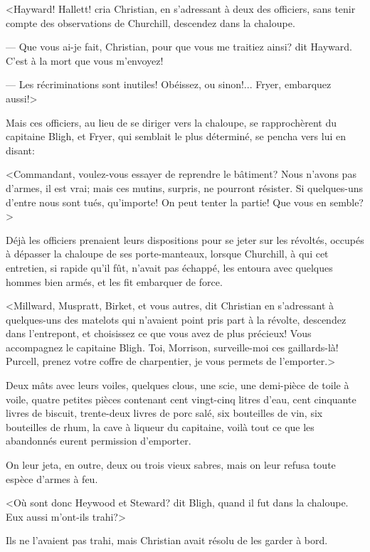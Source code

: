 <Hayward! Hallett! cria Christian, en s'adressant \`a deux
des officiers, sans tenir compte des observations de Churchill,
descendez dans la chaloupe.

--- Que vous ai-je fait, Christian, pour que vous me traitiez
ainsi? dit Hayward. C'est \`a la mort que vous m'envoyez!

--- Les r\'ecriminations sont inutiles!
Ob\'eissez, ou sinon!... Fryer, embarquez aussi!>

Mais ces officiers, au lieu de se diriger vers la chaloupe,
se rapproch\`erent du capitaine Bligh, et Fryer, qui semblait
le plus d\'etermin\'e, se pencha vers lui en disant:

<Commandant, voulez-vous essayer de reprendre le b\^atiment?
Nous n'avons pas d'armes, il est vrai; mais ces mutins,
surpris, ne pourront r\'esister. Si quelques-uns d'entre nous
sont tu\'es, qu'importe! On peut tenter la partie!
Que vous en semble?>

D\'ej\`a les officiers prenaient leurs dispositions
pour se jeter sur les r\'evolt\'es, occup\'es
\`a d\'epasser la chaloupe de ses porte-manteaux,
lorsque Churchill, \`a qui cet entretien, si rapide
qu'il f\^ut, n'avait pas \'echapp\'e,
les entoura avec quelques hommes bien arm\'es,
et les fit embarquer de force.

<Millward, Muspratt, Birket, et vous autres, dit Christian
en s'adressant \`a quelques-uns des matelots qui n'avaient
point pris part \`a la r\'evolte, descendez dans l'entrepont,
et choisissez ce que vous avez de plus pr\'ecieux!
Vous accompagnez le capitaine Bligh. Toi, Morrison,
surveille-moi ces gaillards-l\`a! Purcell, prenez votre
coffre de charpentier, je vous permets de l'emporter.>

Deux m\^ats avec leurs voiles, quelques clous, une scie,
une demi-pi\`ece de toile \`a voile, quatre petites pi\`eces
contenant cent vingt-cinq litres d'eau, cent cinquante livres
de biscuit, trente-deux livres de porc sal\'e, six bouteilles
de vin, six bouteilles de rhum, la cave \`a liqueur du capitaine,
voil\`a tout ce que les abandonn\'es eurent permission d'emporter.

On leur jeta, en outre, deux ou trois vieux sabres,
mais on leur refusa toute esp\`ece d'armes \`a feu.

<O\`u sont donc Heywood et Steward? dit Bligh, quand
il fut dans la chaloupe. Eux aussi m'ont-ils trahi?>

Ils ne l'avaient pas trahi, mais Christian avait r\'esolu
de les garder \`a bord.

